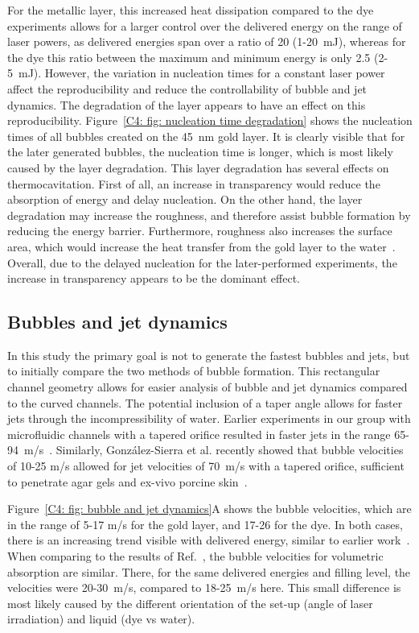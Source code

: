 \documentclass[11pt]{article}
\begin{document}
For the metallic layer, this increased heat dissipation compared to the dye experiments allows for a larger control over the delivered energy on the range of laser powers, as delivered energies span over a ratio of 20 (1-20~mJ), whereas for the dye this ratio between the maximum and minimum energy is only 2.5 (2-5~mJ). However, the variation in nucleation times for a constant laser power affect the reproducibility and reduce the controllability of bubble and jet dynamics. The degradation of the layer appears to have an effect on this reproducibility. Figure~\ref{C4: fig: nucleation time degradation} shows the nucleation times of all bubbles created on the 45~nm gold layer. It is clearly visible that for the later generated bubbles, the nucleation time is longer, which is most likely caused by the layer degradation. This layer degradation has several effects on thermocavitation. First of all, an increase in transparency would reduce the absorption of energy and delay nucleation. On the other hand, the layer degradation may increase the roughness, and therefore assist bubble formation by reducing the energy barrier. Furthermore, roughness also increases the surface area, which would increase the heat transfer from the gold layer to the water~\cite{Jones2009}. Overall, due to the delayed nucleation for the later-performed experiments, the increase in transparency appears to be the dominant effect.

\subsection{Bubbles and jet dynamics}
In this study the primary goal is not to generate the fastest bubbles and jets, but to initially compare the two methods of bubble formation. This rectangular channel geometry allows for easier analysis of bubble and jet dynamics compared to the curved channels. The potential inclusion of a taper angle allows for faster jets through the incompressibility of water. Earlier experiments in our group with microfluidic channels with a tapered orifice resulted in faster jets in the range 65-94~m/s~\cite{VanderVen2023,OyarteGalvez2020,Berrospe-Rodriguez2017}. Similarly, González-Sierra et al. recently showed that bubble velocities of 10-25 m/s allowed for jet velocities of 70~m/s with a tapered orifice, sufficient to penetrate agar gels and ex-vivo porcine skin~\cite{Gonzalez-sierra2023}.

Figure~\ref{C4: fig: bubble and jet dynamics}A shows the bubble velocities, which are in the range of 5-17 m/s for the gold layer, and 17-26 for the dye. In both cases, there is an increasing trend visible with delivered energy, similar to earlier work~\cite{Schoppink2023-ETFS,Schoppink2024}. When comparing to the results of Ref.~\cite{Schoppink2024}, the bubble velocities for volumetric absorption are similar. There, for the same delivered energies and filling level, the velocities were 20-30~m/s, compared to 18-25~m/s here. This small difference is most likely caused by the different orientation of the set-up (angle of laser irradiation) and liquid (dye vs water).
\end{document}
